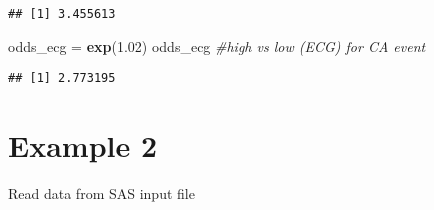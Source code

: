 \documentclass[]{article}
\newenvironment{Shaded}{\begin{snugshade}}{\end{snugshade}}
\newcommand{\KeywordTok}[1]{\textcolor[rgb]{0.13,0.29,0.53}{\textbf{#1}}}
\newcommand{\FloatTok}[1]{\textcolor[rgb]{0.00,0.00,0.81}{#1}}
\newcommand{\StringTok}[1]{\textcolor[rgb]{0.31,0.60,0.02}{#1}}
\newcommand{\CommentTok}[1]{\textcolor[rgb]{0.56,0.35,0.01}{\textit{#1}}}
\newcommand{\NormalTok}[1]{#1}
\begin{document}
\begin{verbatim}
## [1] 3.455613
\end{verbatim}

\begin{Shaded}
\begin{Highlighting}[]
\NormalTok{odds_ecg =}\StringTok{ }\KeywordTok{exp}\NormalTok{(}\FloatTok{1.02}\NormalTok{)}
\NormalTok{odds_ecg                   }\CommentTok{#high vs low (ECG) for CA event}
\end{Highlighting}
\end{Shaded}

\begin{verbatim}
## [1] 2.773195
\end{verbatim}

\section{Example 2}\label{example-2}

Read data from SAS input file
\end{document}
